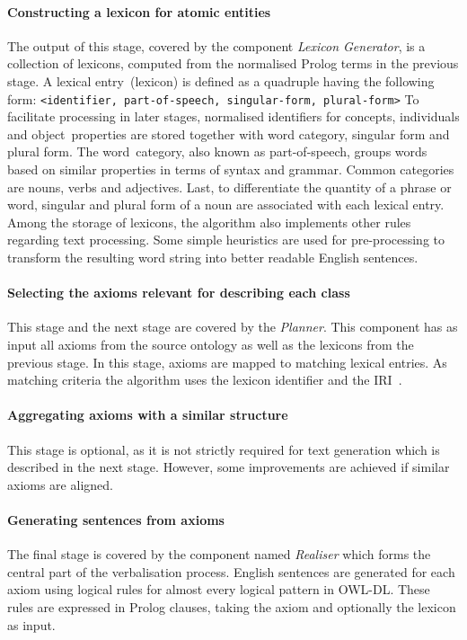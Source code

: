 \documentclass[draft,final]{vutinfth} %
\begin{document}
\paragraph{Constructing a lexicon for atomic entities} The output of this stage, covered by the component \textit{Lexicon Generator}, is a collection of lexicons, computed from the normalised Prolog terms in the previous stage. A lexical entry~(lexicon) is defined as a quadruple having the following form: \texttt{<identifier, part-of-speech, singular-form, plural-form>} To facilitate processing in later stages, normalised identifiers for concepts, individuals and object~properties are stored together with word category, singular form and plural form. The word~category, also known as part-of-speech, groups words based on similar properties in terms of syntax and grammar. Common categories are nouns, verbs and adjectives. Last, to differentiate the quantity of a phrase or word, singular and plural form of a noun are associated with each lexical entry. 
Among the storage of lexicons, the algorithm also implements other rules regarding text processing. Some simple heuristics are used for pre-processing to transform the resulting word string into better readable English sentences. 

\paragraph{Selecting the axioms relevant for describing each class} This stage and the next stage are covered by the \textit{Planner}.
This component has as input all axioms from the source ontology as well as the lexicons from the previous stage. In this stage, axioms are mapped to matching lexical entries. As matching criteria the algorithm uses the lexicon identifier and the IRI~\cite{rfc3987}. 

\paragraph{Aggregating axioms with a similar structure} This stage is optional, as it is not strictly required for text generation which is described in the next stage. However, some improvements are achieved if similar axioms are aligned. 

\paragraph{Generating sentences from axioms} The final stage is covered by the component named \textit{Realiser} which forms the central part of the
verbalisation process. English sentences are generated for each axiom using logical rules for almost every logical pattern in OWL-DL. These rules are expressed in Prolog clauses, taking the axiom and optionally the lexicon as input.
\end{document}
